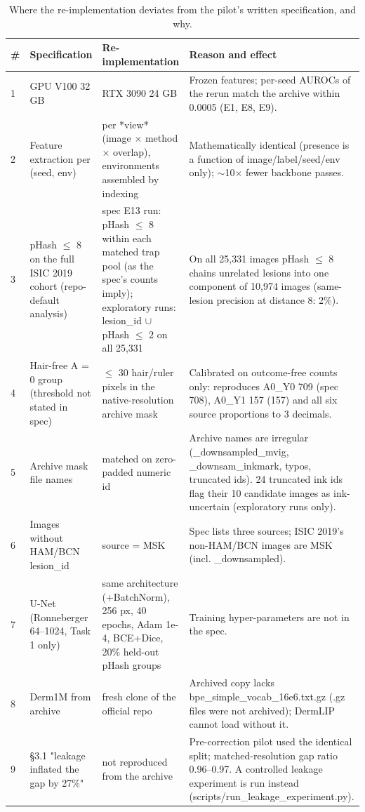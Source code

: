 \begin{table}[H]\centering\scriptsize
\caption{Where the re-implementation deviates from the pilot's written specification, and why.}\label{tab:dev}
\begin{tabular}{lp{3.0cm}p{4.6cm}p{7.0cm}}\toprule
\# & Specification & Re-implementation & Reason and effect \\\midrule
1 & GPU V100 32 GB & RTX 3090 24 GB & Frozen features; per-seed AUROCs of the rerun match the archive within 0.0005 (E1, E8, E9). \\
2 & Feature extraction per (seed, env) & per *view* (image $\times$ method $\times$ overlap), environments assembled by indexing & Mathematically identical (presence is a function of image/label/seed/env only); $\sim$10$\times$ fewer backbone passes. \\
3 & pHash $\le$ 8 on the full ISIC 2019 cohort (repo-default analysis) & spec E13 run: pHash $\le$ 8 within each matched trap pool (as the spec's counts imply); exploratory runs: lesion\_id $\cup$ pHash $\le$ 2 on all 25,331 & On all 25,331 images pHash $\le$ 8 chains unrelated lesions into one component of 10,974 images (same-lesion precision at distance 8: 2\%). \\
4 & Hair-free A = 0 group (threshold not stated in spec) & $\le$ 30 hair/ruler pixels in the native-resolution archive mask & Calibrated on outcome-free counts only: reproduces A0\_Y0 709 (spec 708), A0\_Y1 157 (157) and all six source proportions to 3 decimals. \\
5 & Archive mask file names & matched on zero-padded numeric id & Archive names are irregular (\_downsampled\_mvig, \_downsam\_inkmark, typos, truncated ids). 24 truncated ink ids flag their 10 candidate images as ink-uncertain (exploratory runs only). \\
6 & Images without HAM/BCN lesion\_id & source = MSK & Spec lists three sources; ISIC 2019's non-HAM/BCN images are MSK (incl. \_downsampled). \\
7 & U-Net (Ronneberger 64--1024, Task 1 only) & same architecture (+BatchNorm), 256 px, 40 epochs, Adam 1e-4, BCE+Dice, 20\% held-out pHash groups & Training hyper-parameters are not in the spec. \\
8 & Derm1M from archive & fresh clone of the official repo & Archived copy lacks bpe\_simple\_vocab\_16e6.txt.gz (.gz files were not archived); DermLIP cannot load without it. \\
9 & §3.1 "leakage inflated the gap by 27\%" & not reproduced from the archive & Pre-correction pilot used the identical split; matched-resolution gap ratio 0.96--0.97. A controlled leakage experiment is run instead (scripts/run\_leakage\_experiment.py). \\
\bottomrule\end{tabular}
\end{table}
